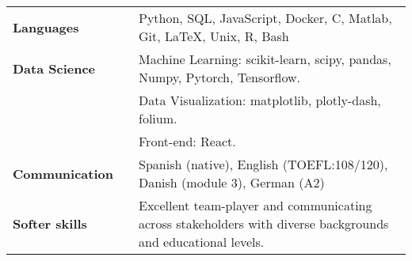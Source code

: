 \documentclass[a4paper, 12pt]{article}
\begin{document}
\begin{tabular}{p{8em} p{1em} p{43em}}
\textbf{Languages} & &  Python, SQL, JavaScript, Docker, C, Matlab, Git, \LaTeX, Unix, R,  Bash \\
\textbf{Data Science} & & Machine Learning: scikit-learn, scipy, pandas, Numpy, Pytorch, Tensorflow. \\
& & Data Visualization: matplotlib, plotly-dash, folium. \\
& & Front-end: React. \\
\textbf{Communication} & & Spanish (native), English (TOEFL:108/120), Danish (module 3), German (A2) \\
\textbf{Softer skills} & & Excellent team-player and communicating across stakeholders with diverse backgrounds and educational levels.  \\
\end{tabular}
\end{document}
